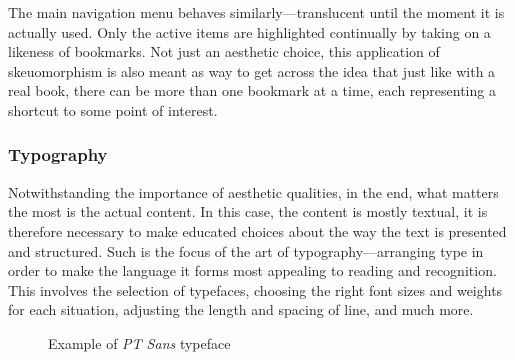 \documentclass[thesis=M,english,hidelinks]{FITthesis}[2012/10/20]
\begin{document}
The main navigation menu behaves similarly---translucent until the moment it is actually used. Only the active items are highlighted continually by taking on a likeness of bookmarks. Not just an aesthetic choice, this application of skeuomorphism is also meant as way to get across the idea that just like with a real book, there can be more than one bookmark at a time, each representing a shortcut to some point of interest.

    \subsubsection{Typography}

Notwithstanding the importance of aesthetic qualities, in the end, what matters the most is the actual content. In this case, the content is mostly textual, it is therefore necessary to make educated choices about the way the text is presented and structured. Such is the focus of the art of typography---arranging type in order to make the language it forms most appealing to reading and recognition. This involves the selection of typefaces, choosing the right font sizes and weights for each situation, adjusting the length and spacing of line, and much more.

\begin{figure}
  \setlength\fboxsep{0pt}
  \setlength\fboxrule{0.2pt}
  \caption{Example of \textit{PT Sans} typeface}
  \label{fig:pt_sans}
\end{figure}
\end{document}
